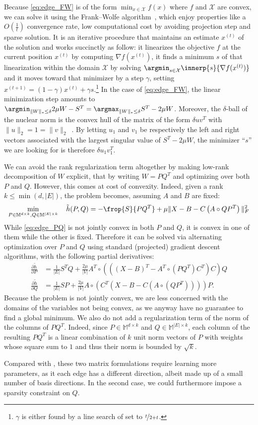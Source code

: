 Because \eqref{eq:edge_FW} is of the form $\min_{x\in \mathcal{X}} f(x)$ where $f$ and $\mathcal{X}$
are convex, we can solve it using the Frank--Wolfe algorithm~\autocites{FrankWolfe56}{Jaggi2013a},
which enjoy properties like a $O(\frac{1}{t})$ convergence rate, low computational cost by avoiding
projection step and sparse solution. It is an iterative procedure that maintains an estimate
$x^{(t)}$ of the solution and works succinctly as follow: it linearizes the objective $f$ at the
current position $x^{(t)}$ by computing $\nabla f(x^{(t)})$, it finds a minimum $s$ of that
linearization within the domain $\mathcal{X}$ by solving $\argmin_{s\in \mathcal{X}}
\innerp{s}{\nabla f(x^{(t)})}$ and it moves toward that minimizer by a step $\gamma$, setting
$x^{(t+1)} = (1-\gamma) x^{(t)} + \gamma s$.\footnote{$\gamma$ is either found by a line search of
set to $\nicefrac{t}{2+t}$.} In the case of \eqref{eq:edge_FW}, the linear minimization step amounts
to $\argmin_{\|W\|_* \leq \delta} 2\mu W - S^T = \argmax_{\|W\|_* \leq \delta} S^T - 2\mu W$.
Moreover, the $\delta$-ball of the nuclear norm is the convex hull of the matrix of the form $\delta
u v^T$ with $\|u\|_2 = 1 = \|v\|_2$~\autocite{Jaggi2013a}. By letting $u_1$ and $v_1$ be
respectively the left and right vectors associated with the largest singular value of $S^T - 2\mu
W$, the minimizer \enquote{$s$} we are looking for is therefore $\delta u_1 v_1^T$.

\medskip

We can avoid the rank regularization term altogether by making low-rank decomposition of $W$
explicit, that by writing $W=PQ^T$ and optimizing over both $P$ and $Q$. However, this comes at cost
of convexity. Indeed, given a rank $k\leq \min(d,|E|)$, the problem becomes, assuming $A$ and $B$
are fixed:
\begin{equation}
  \label{eq:edge_PQ}
  \min_{P\in\mathbb{M}^{d\times k}, Q\in\mathbb{M}^{|E|\times k}} \quad \tilde{h}(P, Q) =
  - \frop{S}{PQ^T} + \mu \|X - B - C\left(A\circ QP^T \right)\|_F^2
\end{equation}
While \eqref{eq:edge_PQ} is not jointly convex in both $P$ and $Q$, it is convex in one of
them while the other is fixed. Therefore it can be solved via alternating optimization over $P$ and
$Q$ using standard (projected) gradient descent algorithms, with the following partial derivatives:
\begin{align*}
  \frac{\partial \tilde{h}}{\partial P} &=
  \frac{1}{|E|} S^T Q + \frac{2\mu}{|V|}
  A^T \circ (((X-B)^T -A^T \circ (PQ^T )C^T )C)Q 
  \\
  \frac{\partial \tilde{h}}{\partial Q} &=
  \frac{1}{|E|} S P + \frac{2\mu}{|V|}
  A\circ (C^T (X-B-C(A\circ (QP^T ))))P.
\end{align*}
Because the problem is not jointly convex, we are less concerned with the domains of the variables
not being convex, as we anyway have no guarantee to find a global minimum. We also do not add a
regularization term of the norm of the columns of $PQ^T$. Indeed, since $P\in\mathbb{M}^{d\times k}$
and $Q\in\mathbb{M}^{|E|\times k}$, each column of the resulting $PQ^T$ is a linear combination of
$k$ unit norm vectors of $P$ with weights whose square sum to $1$ and thus their norm is bounded by
$\sqrt{k}$.

Compared with , these two matrix formulations require learning more parameters,
as it each edge has a different direction, albeit made up of a small number of basis directions. In
the second case, we could furthermore impose a sparsity constraint on $Q$.
